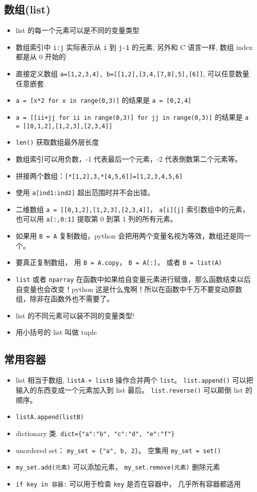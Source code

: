 \subsection{数组(list)}
\begin{itemize}
\item list 的每一个元素可以是不同的变量类型
\item 数组索引中 \verb`i:j` 实际表示从 \verb`i` 到 \verb`j-1` 的元素, 另外和 C 语言一样, 数组 index 都是从 0 开始的
\item 直接定义数组 \verb`a=[1,2,3,4], b=[[1,2],[3,4,[7,8],5],[6]]`, 可以任意数量任意嵌套.
\item \verb`a = [x*2 for x in range(0,3)]` 的结果是 \verb`a = [0,2,4]`
\item \verb`a = [[ii+jj for ii in range(0,3)] for jj in range(0,3)]` 的结果是 \verb`a = [[0,1,2],[1,2,3],[2,3,4]]`
\item \verb`len()` 获取数组最外层长度
\item 数组索引可以用负数，-1 代表最后一个元素，-2 代表倒数第二个元素等。
\item 拼接两个数组：\verb`[*[1,2],3,*[4,5,6]]=[1,2,3,4,5,6]`
\item 使用 \verb`a[ind1:ind2]` 超出范围时并不会出错。
\item 二维数组 \verb`a = [[0,1,2],[1,2,3],[2,3,4]]`， \verb`a[i][j]` 索引数组中的元素，也可以用 \verb`a[:,0:1]` 提取第 0 到第 1 列的所有元素。
\item 如果用 \verb`B = A` 复制数组，python 会把用两个变量名视为等效，数组还是同一个。
\item 要真正复制数组， 用 \verb`B = A.copy`， \verb`B = A[:]`， 或者 \verb`B = list(A)`
\item \verb`list` 或者 \verb`nparray` 在函数中如果给自变量元素进行赋值，那么函数结束以后自变量也会改变！python 这是什么鬼啊！所以在函数中千万不要变动原数组，除非在函数外也不需要了。
\item list 的不同元素可以装不同的变量类型!
\item 用小括号的 list 叫做 tuple
\end{itemize}

\subsection{常用容器}
\begin{itemize}
\item list 相当于数组, \verb`listA + listB` 操作合并两个 \verb`list`。 \verb`list.append()` 可以把输入的东西变成一个元素加入到 list 最后。 \verb`list.reverse()` 可以颠倒 list 的顺序。
\item \verb`listA.append(listB)`
\item dictionary 类.  \verb`dict={"a":"b", "c":"d", "e":"f"}`
\item unordered set： \verb`my_set = {"a", b, 2}`。 空集用 \verb`my_set = set()`
\item \verb`my_set.add(元素)` 可以添加元素， \verb`my_set.remove(元素)` 删除元素
\item \verb`if key in 容器:` 可以用于检查 \verb`key` 是否在容器中， 几乎所有容器都适用
\end{itemize}

